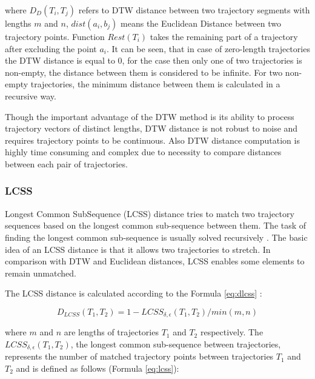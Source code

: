 where $D_D(T_i, T_j)$ refers to DTW distance between two trajectory segments with lengths $m$ and $n$, $dist(a_i, b_j)$ means the Euclidean Distance between two trajectory points. Function $Rest(T_i)$ takes the remaining part of a trajectory after excluding the point $a_i$. It can be seen, that in case of zero-length trajectories the DTW distance is equal to 0, for the case then only one of two trajectories is non-empty, the distance between them is considered to be infinite. For two non-empty trajectories, the minimum distance between them is calculated in a recursive way.

Though the important advantage of the DTW method is its ability to process trajectory vectors of distinct lengths, DTW distance is not robust to noise and requires trajectory points to be continuous. Also DTW distance computation is highly time consuming and complex due to necessity to compare distances between each pair of trajectories.

\subsubsection{LCSS}
Longest Common SubSequence (LCSS) distance tries to match two trajectory sequences based on the longest common sub-sequence between them. The task of finding the longest common sub-sequence is usually solved recursively \cite{article:8_review_mot_cl_alg}. The basic idea of an LCSS distance is that it allows two trajectories to stretch. In comparison with DTW and Euclidean distances, LCSS enables some elements to remain unmatched.

The LCSS distance is calculated according to the Formula \ref{eq:dlcss} \cite{inproceedings:7_related_work}:

\begin{equation} \label{eq:dlcss}
	D_{LCSS}(T_1, T_2) = 1 - LCSS_{\delta, \epsilon}(T_1, T_2) / min(m, n)
\end{equation}

where $m$ and $n$ are lengths of trajectories $T_1$ and $T_2$ respectively. The $LCSS_{\delta, \epsilon}(T_1, T_2)$, the longest common sub-sequence between trajectories, represents the number of matched trajectory points between trajectories $T_1$ and $T_2$ and is defined as follows (Formula \ref{eq:lcss}):

